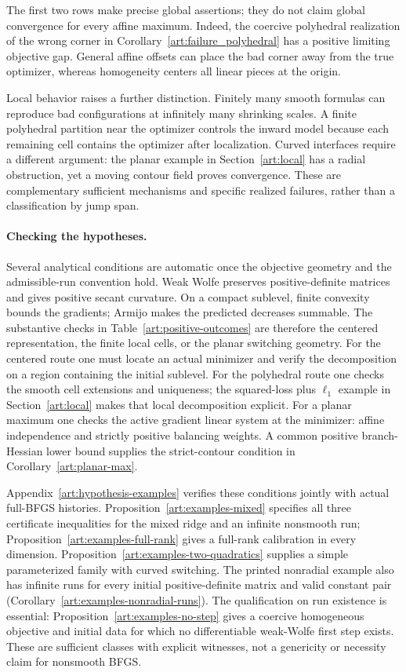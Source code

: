 The first two rows make precise global assertions; they do not claim global
convergence for every affine maximum. Indeed, the coercive polyhedral
realization of the wrong corner in Corollary~\ref{art:failure_polyhedral}
has a positive limiting objective gap. General affine offsets can place the
bad corner away from the true optimizer, whereas homogeneity centers all
linear pieces at the origin.

Local behavior raises a further distinction. Finitely many smooth formulas
can reproduce bad configurations at infinitely many shrinking scales.
A finite polyhedral partition near the optimizer controls the inward model
because each remaining cell contains the optimizer after localization.
Curved interfaces require a different argument: the planar example in
Section~\ref{art:local} has a radial obstruction, yet a moving contour field
proves convergence. These are complementary sufficient mechanisms and
specific realized failures, rather than a classification by jump span.

\paragraph{Checking the hypotheses.}
Several analytical conditions are automatic once the objective geometry and
the admissible-run convention hold. Weak Wolfe preserves positive-definite
matrices and gives positive secant curvature. On a compact sublevel, finite
convexity bounds the gradients; Armijo makes the predicted decreases summable.
The substantive checks in Table~\ref{art:positive-outcomes} are therefore the
centered representation, the finite local cells, or the planar switching
geometry. For the centered route one must locate an actual minimizer and
verify the decomposition on a region containing the initial sublevel.
For the polyhedral route one checks the smooth cell extensions and uniqueness;
the squared-loss plus $\ell_1$ example in Section~\ref{art:local} makes that
local decomposition explicit. For a planar maximum one checks the active
gradient linear system at the minimizer: affine independence and strictly
positive balancing weights. A common positive branch-Hessian lower bound
supplies the strict-contour condition in Corollary~\ref{art:planar-max}.

Appendix~\ref{art:hypothesis-examples} verifies these conditions jointly with
actual full-BFGS histories. Proposition~\ref{art:examples-mixed} specifies all
three certificate inequalities for the mixed ridge and an infinite nonsmooth
run; Proposition~\ref{art:examples-full-rank} gives a full-rank calibration in
every dimension. Proposition~\ref{art:examples-two-quadratics} supplies a simple
parameterized family with curved switching. The printed nonradial example
also has infinite runs for every initial positive-definite matrix and valid
constant pair (Corollary~\ref{art:examples-nonradial-runs}). The qualification
on run existence is essential: Proposition~\ref{art:examples-no-step} gives
a coercive homogeneous objective and initial data for which no differentiable
weak-Wolfe first step exists. These are sufficient classes with explicit
witnesses, not a genericity or necessity claim for nonsmooth BFGS.
